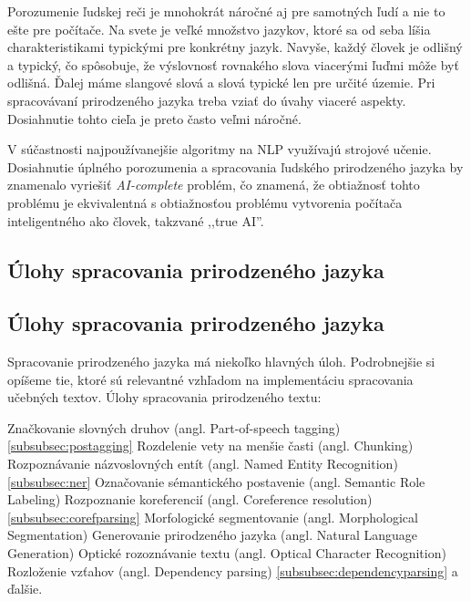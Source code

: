 Porozumenie ľudskej reči je mnohokrát náročné aj pre samotných ľudí a nie to ešte pre počítače. Na svete je veľké množstvo jazykov, ktoré sa od seba líšia charakteristikami typickými pre konkrétny jazyk. Navyše, každý človek je odlišný a typický, čo spôsobuje, že výslovnosť rovnakého slova viacerými ľuďmi môže byť odlišná. Ďalej máme slangové slová a slová typické len pre určité územie. Pri spracovávaní prirodzeného jazyka treba vziať do úvahy viaceré aspekty. Dosiahnutie tohto cieľa je preto často veľmi náročné.

V súčastnosti najpoužívanejšie algoritmy na NLP využívajú strojové učenie. Dosiahnutie úplného porozumenia a spracovania ľudského prirodzeného jazyka by znamenalo vyriešiť \textit{AI-complete} problém, čo znamená, že obtiažnosť tohto problému je ekvivalentná s obtiažnosťou problému vytvorenia počítača inteligentného ako človek, takzvané ,,true AI''.


%
%
{
	\subsection{Úlohy spracovania prirodzeného jazyka}
}
{
	\subsection{Úlohy spracovania prirodzeného jazyka}
}
\label{subsec:tasksofnlp}
Spracovanie prirodzeného jazyka má niekoľko hlavných úloh. Podrobnejšie si opíšeme tie, ktoré sú relevantné vzhľadom na implementáciu spracovania učebných textov.
Úlohy spracovania prirodzeného textu:~\cite{collobert2011} 
\begin{my_itemize}
	\myitem Značkovanie slovných druhov (angl. Part-of-speech tagging) \ref{subsubsec:postagging}
	\myitem Rozdelenie vety na menšie časti (angl. Chunking)
	\myitem Rozpoznávanie názvoslovných entít (angl. Named Entity Recognition) \ref{subsubsec:ner}
	\myitem Označovanie sémantického postavenie (angl. Semantic Role Labeling)
	\myitem Rozpoznanie koreferencií (angl. Coreference resolution) \ref{subsubsec:corefparsing}
	\myitem Morfologické segmentovanie (angl. Morphological Segmentation)
	\myitem Generovanie prirodzeného jazyka (angl. Natural Language Generation)
	\myitem Optické rozoznávanie textu (angl. Optical Character Recognition)
	\myitem Rozloženie vzťahov (angl. Dependency parsing) \ref{subsubsec:dependencyparsing}
	\myitem a ďalšie.
\end{my_itemize}

